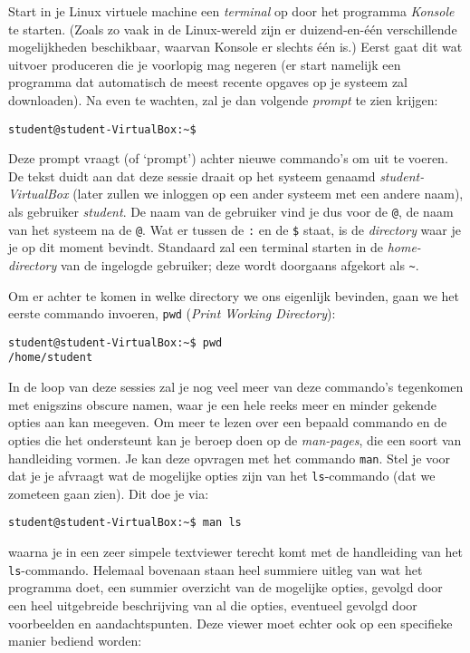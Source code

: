 \documentclass[a4paper,twoside,openany]{memoir}
\begin{document}
Start in je Linux virtuele machine een \emph{terminal} op door het programma
\emph{Konsole} te starten. (Zoals zo vaak in de Linux-wereld zijn er
duizend-en-één verschillende mogelijkheden beschikbaar, waarvan Konsole er
slechts één is.) Eerst gaat dit wat uitvoer produceren die je voorlopig mag
negeren (er start namelijk een programma dat automatisch de meest recente
opgaves op je systeem zal downloaden). Na even te wachten, zal je dan volgende
\emph{prompt} te zien krijgen:

\begin{verbatim}
student@student-VirtualBox:~$ 
\end{verbatim}

Deze prompt vraagt (of `prompt') achter nieuwe commando's om uit te voeren. De
tekst duidt aan dat deze sessie draait op het systeem genaamd
\emph{student-VirtualBox} (later zullen we inloggen op een ander systeem met een
andere naam), als gebruiker \emph{student}. De naam van de gebruiker vind je dus
voor de \texttt{@}, de naam van het systeem na de \texttt{@}. Wat er tussen de
\texttt{:} en de \texttt{\$} staat, is de \emph{directory} waar je je op dit
moment bevindt. Standaard zal een terminal starten in de \emph{home-directory}
van de ingelogde gebruiker; deze wordt doorgaans afgekort als \texttt{\~}.

Om er achter te komen in welke directory we ons eigenlijk bevinden, gaan we het
eerste commando invoeren, \verb!pwd! (\emph{Print Working Directory}):

\begin{verbatim}
student@student-VirtualBox:~$ pwd
/home/student
\end{verbatim}

In de loop van deze sessies zal je nog veel meer van deze commando's tegenkomen
met enigszins obscure namen, waar je een hele reeks meer en minder gekende
opties aan kan meegeven. Om meer te lezen over een bepaald commando en de opties
die het ondersteunt kan je beroep doen op de \emph{man-pages}, die een soort van
handleiding vormen. Je kan deze opvragen met het commando \verb!man!. Stel je
voor dat je je afvraagt wat de mogelijke opties zijn van het \verb!ls!-commando
(dat we zometeen gaan zien). Dit doe je via:

\begin{verbatim}
student@student-VirtualBox:~$ man ls
\end{verbatim}
waarna je in een zeer simpele textviewer terecht komt met de handleiding van het
\verb!ls!-commando. Helemaal bovenaan staan heel summiere uitleg van wat het
programma doet, een summier overzicht van de mogelijke opties, gevolgd door een
heel uitgebreide beschrijving van al die opties, eventueel gevolgd door
voorbeelden en aandachtspunten. Deze viewer moet echter ook op een specifieke
manier bediend worden:
\end{document}
